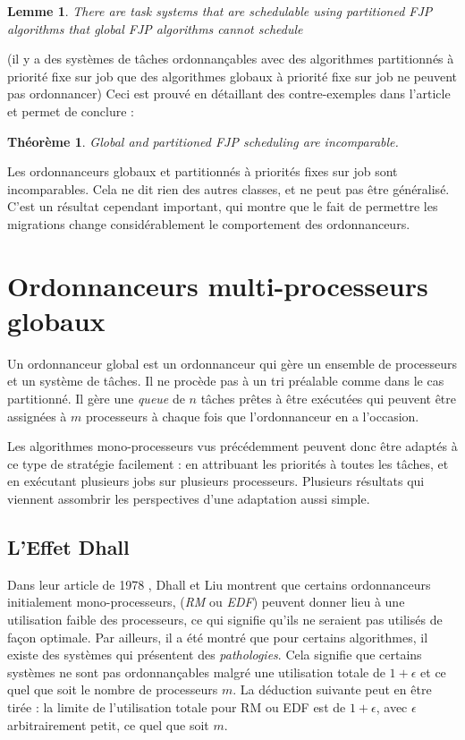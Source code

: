 \documentclass[11pt,a4paper,oneside]{report}
\newtheorem{mytheorem}{Théorème}
\newtheorem{mylemme}{Lemme}
\begin{document}
	\begin{mylemme}
		There are task systems that are schedulable using partitioned FJP algorithms that global FJP algorithms cannot schedule
	\end{mylemme}
	(il y a des systèmes de tâches ordonnançables avec des algorithmes partitionnés à priorité fixe 
	sur job que des algorithmes globaux à priorité fixe sur job ne peuvent pas ordonnancer)\medskip
	Ceci est prouvé en détaillant des contre-exemples dans l'article et permet de conclure :\medskip
	\begin{mytheorem}
		Global and partitioned FJP scheduling are incomparable.
	\end{mytheorem}
	Les ordonnanceurs globaux et partitionnés à priorités fixes sur job sont incomparables. 
	Cela ne dit rien des autres classes, et ne peut pas être généralisé. C'est 
	un résultat cependant important, qui montre que le fait de permettre les migrations 
	change considérablement le comportement des ordonnanceurs.
	
	\section{Ordonnanceurs multi-processeurs globaux}
	Un ordonnanceur global est un ordonnanceur qui gère un ensemble de processeurs et 
	un système de tâches. Il ne procède pas à un tri préalable comme dans le cas partitionné. 
	Il gère une \textit{queue} de $n$ tâches prêtes à être exécutées 
	qui peuvent être assignées à $m$ processeurs à chaque fois que l'ordonnanceur en a l'occasion.\medskip
	
	Les algorithmes mono-processeurs vus précédemment peuvent donc être adaptés 
	à ce type de stratégie facilement : en attribuant les priorités à toutes les tâches, et en 
	exécutant plusieurs jobs sur plusieurs processeurs. 
	Plusieurs résultats qui viennent assombrir les perspectives d'une adaptation aussi simple. \medskip
	
	\subsection{L'Effet Dhall}
	Dans leur article de 1978 \cite{dhall_real-time_1978}, Dhall et Liu montrent que certains ordonnanceurs 
	initialement mono-processeurs, (\textit{RM} ou \textit{EDF}) peuvent donner lieu à une utilisation faible des 
	processeurs, ce qui signifie qu'ils ne seraient pas utilisés de façon optimale.\medskip 
	Par ailleurs, il a été montré que pour certains algorithmes, 
	il existe des systèmes qui présentent des \textit{pathologies}.
	Cela signifie que certains systèmes ne sont pas ordonnançables malgré une 
	utilisation totale de $1 + \epsilon$ et ce quel que soit le nombre de processeurs $m$.
	La déduction suivante peut en être tirée : la limite de l'utilisation totale 
	pour RM ou EDF est de $1 + \epsilon$, avec $\epsilon$ arbitrairement petit, ce 
	quel que soit $m$. 
	
\end{document}
